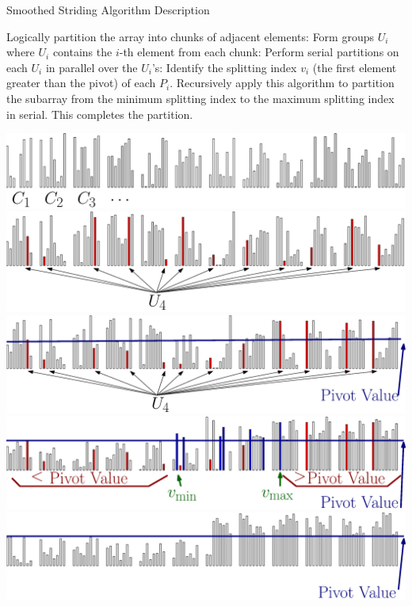 \documentclass[xcolor=x11names, svgnames, rgb]{beamer}
\begin{document}
\begin{frame}[t]{Smoothed Striding Algorithm Description}
	\vspace{0.25cm}
	\begin{overprint}
	Logically partition the array into chunks of adjacent elements:
	\onslide<2>Form groups $U_i$ where $U_i$ contains the $i$-th element from each chunk:
	\onslide<3>Perform serial partitions on each $U_i$ in parallel over the $U_i$'s:
	\onslide<4>Identify the splitting index $v_i$ (the first element greater than the pivot) of each $P_i$. 
	\onslide<5>Recursively apply this algorithm to partition the subarray from the minimum splitting index to the maximum splitting index in serial. This completes the partition. 
	\end{overprint}
	\vspace{0.25cm}
	\begin{overprint}
	\includegraphics[width=\linewidth]{imgs/smoothedAlgSim1Ann.eps}
	\onslide<2>\includegraphics[width=\linewidth]{imgs/smoothedAlgSim2Ann.eps}
	\onslide<3>\includegraphics[width=\linewidth]{imgs/smoothedAlgSim3Ann.eps}
	\onslide<4>\includegraphics[width=\linewidth]{imgs/smoothedAlgSim4Ann.eps}
	\onslide<5>\includegraphics[width=\linewidth]{imgs/smoothedAlgSim5Ann.eps}

\end{overprint}
\end{frame}
\end{document}
